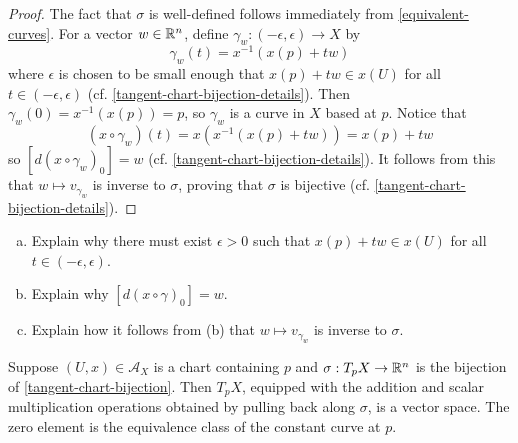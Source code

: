 \begin{proof}
	The fact that $\sigma$ is well-defined follows immediately from \cref{equivalent-curves}. For a vector $w \in \mathbb{R}^n$, define $\gamma_w : (-\epsilon, \epsilon) \to X$ by \[ \gamma_w(t) = x^{-1}(x(p) + tw) \]
	where $\epsilon$ is chosen to be small enough that $x(p) + tw \in x(U)$ for all $t \in (-\epsilon, \epsilon)$ (cf. \cref{tangent-chart-bijection-details}).  
	Then $\gamma_w(0) = x^{-1}(x(p)) = p$, so $\gamma_w$ is a curve in $X$ based at $p$. Notice that
	\[ (x \circ \gamma_w)(t) = x(x^{-1}(x(p)+tw)) = x(p) + tw \]
	so $[d(x \circ \gamma_w)_0] = w$ (cf. \cref{tangent-chart-bijection-details}). It follows from this that $w \mapsto v_{\gamma_w}$ is inverse to $\sigma$, proving that $\sigma$ is bijective (cf. \cref{tangent-chart-bijection-details}). 
\end{proof}

\begin{exercise} \label{tangent-chart-bijection-details}
	\begin{enumerate}[(a)]
		\item Explain why there must exist $\epsilon > 0$ such that $x(p) + tw \in x(U)$ for all $t \in (-\epsilon, \epsilon)$. 
		\item Explain why $[d(x\circ \gamma)_0] = w$. 
		\item Explain how it follows from (b) that $w \mapsto v_{\gamma_w}$ is inverse to $\sigma$. 
	\end{enumerate}
\end{exercise}

\begin{lemma} \label{tangent-pullback-vector-space}
	Suppose $(U, x) \in \mathscr{A}_X$ is a chart containing $p$ and $\sigma : T_p X \to \mathbb{R}^n$ is the bijection of \cref{tangent-chart-bijection}. Then $T_p X$, equipped with the addition and scalar multiplication operations obtained by pulling back along $\sigma$, is a vector space. The zero element is the equivalence class of the constant curve at $p$. 
\end{lemma}


